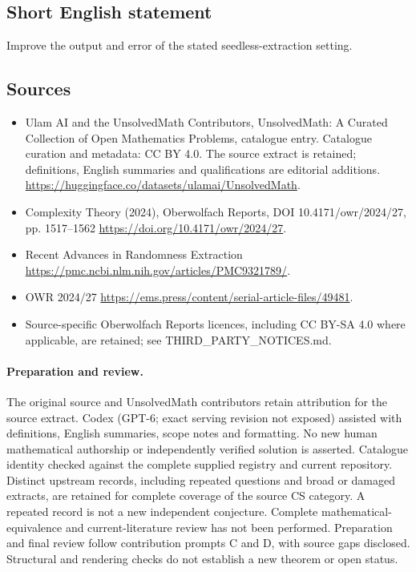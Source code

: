 \documentclass[11pt]{article}
\begin{document}
\subsection{Short English statement}
Improve the output and error of the stated seedless-extraction setting.
\subsection{Sources}
\begin{itemize}
\item[\hypertarget{source:statement:1}{S1}] Ulam AI and the UnsolvedMath Contributors, UnsolvedMath: A Curated Collection of Open Mathematics Problems, catalogue entry. Catalogue curation and metadata: CC BY 4.0. The source extract is retained; definitions, English summaries and qualifications are editorial additions.
\url{https://huggingface.co/datasets/ulamai/UnsolvedMath}.
\item[\hypertarget{source:statement:2}{S2}] Complexity Theory (2024), Oberwolfach Reports, DOI 10.4171/owr/2024/27, pp. 1517--1562
\url{https://doi.org/10.4171/owr/2024/27}.
\item[\hypertarget{source:statement:3}{S3}] Recent Advances in Randomness Extraction
\url{https://pmc.ncbi.nlm.nih.gov/articles/PMC9321789/}.
\item[\hypertarget{source:statement:4}{S4}] OWR 2024/27
\url{https://ems.press/content/serial-article-files/49481}.
\item Source-specific Oberwolfach Reports licences, including CC BY-SA 4.0 where applicable, are retained; see THIRD\_PARTY\_NOTICES.md.
\end{itemize}
\paragraph{Preparation and review.}
The original source and UnsolvedMath contributors retain attribution for the source extract. Codex (GPT-6; exact serving revision not exposed) assisted with definitions, English summaries, scope notes and formatting. No new human mathematical authorship or independently verified solution is asserted. Catalogue identity checked against the complete supplied registry and current repository. Distinct upstream records, including repeated questions and broad or damaged extracts, are retained for complete coverage of the source CS category. A repeated record is not a new independent conjecture. Complete mathematical-equivalence and current-literature review has not been performed. Preparation and final review follow contribution prompts C and D, with source gaps disclosed. Structural and rendering checks do not establish a new theorem or open status.
\label{end:statement}
\end{document}
